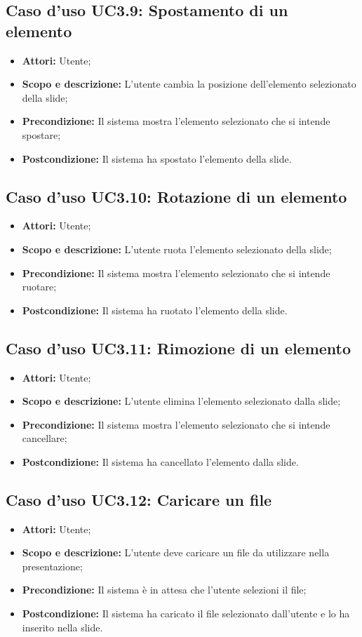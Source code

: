 \subsection{Caso d'uso UC3.9: Spostamento di un elemento}
\begin{itemize}
	\item \textbf{Attori:} Utente;
	\item \textbf{Scopo e descrizione:} L'utente cambia la posizione dell'elemento selezionato della slide;
	\item \textbf{Precondizione:} Il sistema mostra l'elemento selezionato che si intende spostare;
	\item \textbf{Postcondizione:} Il sistema ha spostato l'elemento della slide.
\end{itemize}

\subsection{Caso d'uso UC3.10: Rotazione di un elemento}
\begin{itemize}
	\item \textbf{Attori:} Utente;
	\item \textbf{Scopo e descrizione:} L'utente ruota l'elemento selezionato della slide;
	\item \textbf{Precondizione:} Il sistema mostra l'elemento selezionato che si intende ruotare;
	\item \textbf{Postcondizione:} Il sistema ha ruotato l'elemento della slide.
\end{itemize}

\subsection{Caso d'uso UC3.11: Rimozione di un elemento}
\begin{itemize}
	\item \textbf{Attori:} Utente;
	\item \textbf{Scopo e descrizione:} L'utente elimina l'elemento selezionato dalla slide;
	\item \textbf{Precondizione:} Il sistema mostra l'elemento selezionato che si intende cancellare;
	\item \textbf{Postcondizione:} Il sistema ha cancellato l'elemento dalla slide.
\end{itemize}

\subsection{Caso d'uso UC3.12: Caricare un file}
\begin{itemize}
	\item \textbf{Attori:} Utente;
	\item \textbf{Scopo e descrizione:} L'utente deve caricare un file da utilizzare nella presentazione;
	\item \textbf{Precondizione:} Il sistema è in attesa che l'utente selezioni il file;
	\item \textbf{Postcondizione:} Il sistema ha caricato il file selezionato dall'utente e lo ha inserito nella slide.
\end{itemize}

